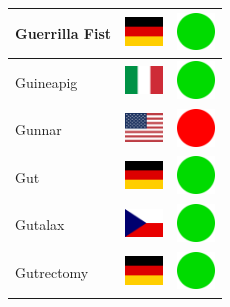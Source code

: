 \documentclass[12pt, a4paper, twoside]{report}
\begin{document}
\begin{center}
\begin{longtable}{|p{5cm}|p{2cm}|p{2cm}|}
 Guerrilla Fist                                             & \includegraphics[width=1cm]{../img/flags/de} &   \includegraphics[width=1cm]{../likes/y} \\ \hline
 Guineapig                                                  & \includegraphics[width=1cm]{../img/flags/it} &   \includegraphics[width=1cm]{../likes/y} \\ \hline
 Gunnar                                                     & \includegraphics[width=1cm]{../img/flags/us} &   \includegraphics[width=1cm]{../likes/n} \\ \hline
 Gut                                                        & \includegraphics[width=1cm]{../img/flags/de} &   \includegraphics[width=1cm]{../likes/y} \\ \hline
 Gutalax                                                    & \includegraphics[width=1cm]{../img/flags/cz} &   \includegraphics[width=1cm]{../likes/y} \\ \hline
 Gutrectomy                                                 & \includegraphics[width=1cm]{../img/flags/de} &   \includegraphics[width=1cm]{../likes/y} \\ \hline

\end{longtable}
\end{center}
\end{document}
